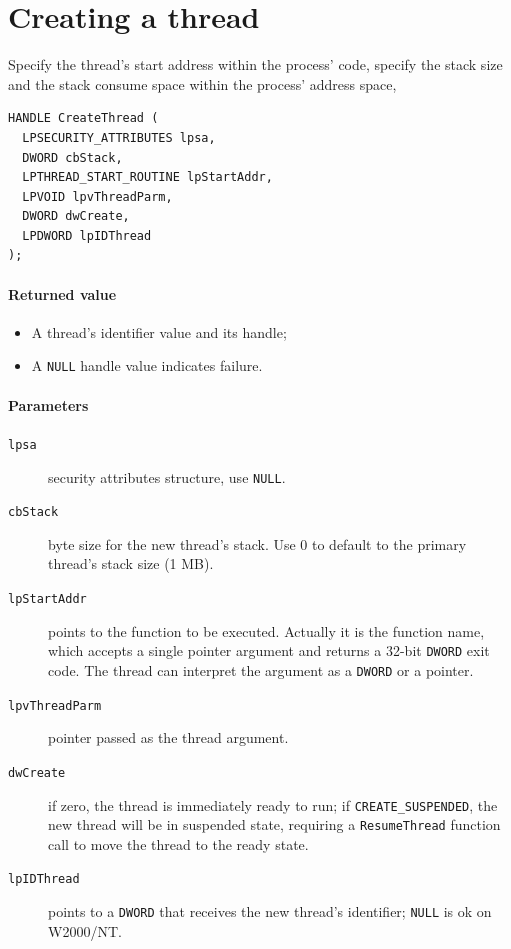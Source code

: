 \section{Creating a thread}
Specify the thread's start address within the process' code, specify the stack size and the stack consume space within the process' address space, 

\begin{verbatim}
HANDLE CreateThread (
  LPSECURITY_ATTRIBUTES lpsa,
  DWORD cbStack,
  LPTHREAD_START_ROUTINE lpStartAddr,
  LPVOID lpvThreadParm,
  DWORD dwCreate,
  LPDWORD lpIDThread
);
\end{verbatim}

\paragraph{Returned value}
\begin{itemize}
\item A thread's identifier value and its handle;
\item A \texttt{NULL} handle value indicates failure.
\end{itemize}

\paragraph{Parameters}
\begin{description}
\item [\texttt{lpsa}] security attributes structure, use \texttt{NULL}.
\item [\texttt{cbStack}] byte size for the new thread's stack. Use 0 to default to the primary thread's stack size (1 MB).
\item [\texttt{lpStartAddr}] points to the function to be executed. Actually it is the function name, which accepts a single pointer argument and returns a 32-bit \texttt{DWORD} exit code. The thread can interpret the argument as a \texttt{DWORD} or a pointer.
\item [\texttt{lpvThreadParm}] pointer passed as the thread argument.
\item [\texttt{dwCreate}] if zero, the thread is immediately ready to run; if \texttt{CREATE\_SUSPENDED}, the new thread will be in suspended state, requiring a \texttt{ResumeThread} function call to move the thread to the ready state.
\item [\texttt{lpIDThread}] points to a \texttt{DWORD} that receives the new thread's identifier; \texttt{NULL} is ok on W2000/NT.
\end{description}

